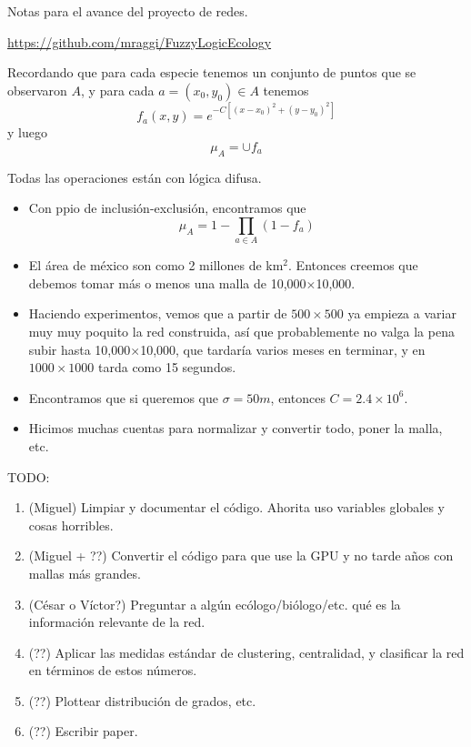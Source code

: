 \documentclass[a4paper,12pt]{article}
\begin{document}
	\begin{center}
	  Notas para el avance del proyecto de redes.
		
		\url{https://github.com/mraggi/FuzzyLogicEcology}
	\end{center}


  Recordando que para cada especie tenemos un conjunto de puntos que se observaron $A$, y para cada $a=(x_0,y_0)\in A$ tenemos
		$$f_a(x,y) = e^{-C\left[(x-x_0)^2 + (y-y_0)^2\right]}$$
  y luego
		$$\mu_A = \cup f_a$$
	
	Todas las operaciones están con lógica difusa.
	
	\begin{itemize}
	  \item Con ppio de inclusión-exclusión, encontramos que
			$$\mu_A = 1-\prod_{a\in A} (1-f_a)$$
		\item El área de méxico son como 2 millones de km$^2$. Entonces creemos que debemos tomar más o menos una malla de 10,000$\times$10,000.
		\item Haciendo experimentos, vemos que a partir de $500\times 500$ ya empieza a variar muy muy poquito la red construida, así que probablemente no valga la pena subir hasta 10,000$\times$10,000, que tardaría varios meses en terminar, y en $1000\times 1000$ tarda como 15 segundos.
		\item Encontramos que si queremos que $\sigma = 50m$, entonces $C = 2.4\times 10^6$.
		\item Hicimos muchas cuentas para normalizar y convertir todo, poner la malla, etc.
	\end{itemize}
	
	
	
	\vspace{1cm}
	TODO:
	
	\begin{enumerate}
		\item (Miguel) Limpiar y documentar el código. Ahorita uso variables globales y cosas horribles.
		\item (Miguel + ??) Convertir el código para que use la GPU y no tarde años con mallas más grandes.
		\item (César o Víctor?) Preguntar a algún ecólogo/biólogo/etc. qué es la información relevante de la red.
		\item (??) Aplicar las medidas estándar de clustering, centralidad, y clasificar la red en términos de estos números.
		\item (??) Plottear distribución de grados, etc.
		\item (??) Escribir paper.
	\end{enumerate}
\end{document}
